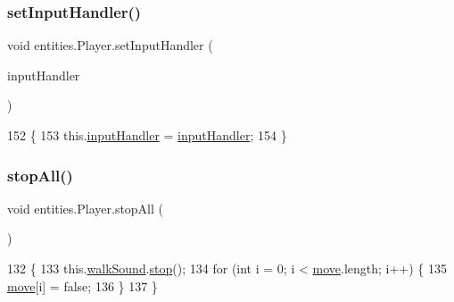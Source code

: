 \subsubsection{\texorpdfstring{set\+Input\+Handler()}{setInputHandler()}}
{\footnotesize\ttfamily void entities.\+Player.\+set\+Input\+Handler (\begin{DoxyParamCaption}\item[{\mbox{\hyperlink{classentities_1_1_input_handler}{Input\+Handler}}}]{input\+Handler }\end{DoxyParamCaption})\hspace{0.3cm}{\ttfamily [inline]}}


\begin{DoxyCode}
152                                                            \{
153         this.\mbox{\hyperlink{classentities_1_1_player_a56ed11dfad1144c333bb21762ff6122e}{inputHandler}} = \mbox{\hyperlink{classentities_1_1_player_a56ed11dfad1144c333bb21762ff6122e}{inputHandler}};
154     \}
\end{DoxyCode}
\mbox{\label{classentities_1_1_player_adc49b9d4f92d988724264ff27f2225d8}} 
\subsubsection{\texorpdfstring{stop\+All()}{stopAll()}}
{\footnotesize\ttfamily void entities.\+Player.\+stop\+All (\begin{DoxyParamCaption}{ }\end{DoxyParamCaption})\hspace{0.3cm}{\ttfamily [inline]}}


\begin{DoxyCode}
132                           \{
133         this.\mbox{\hyperlink{classentities_1_1_player_a79a5a286c847ddeebb54102f66b009a0}{walkSound}}.\mbox{\hyperlink{classorg_1_1newdawn_1_1slick_1_1_sound_a92f5c4af5d3a5a0b26dcf3c6ebb93433}{stop}}();
134         \textcolor{keywordflow}{for} (\textcolor{keywordtype}{int} i = 0; i < \mbox{\hyperlink{classentities_1_1_player_afbadbf8ec5ab49e6cbadb0d39f9ad6d1}{move}}.length; i++) \{
135             \mbox{\hyperlink{classentities_1_1_player_afbadbf8ec5ab49e6cbadb0d39f9ad6d1}{move}}[i] = \textcolor{keyword}{false};
136         \}
137     \}
\end{DoxyCode}
\mbox{\label{classentities_1_1_player_a85565dfb7b3f26180d56992f90b88d56}} 
